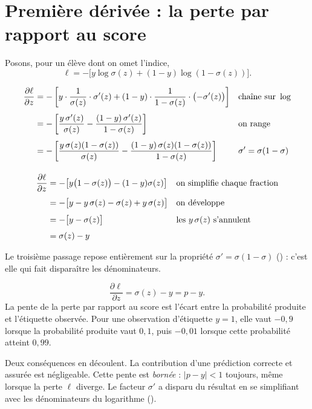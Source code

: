 \section{Première dérivée : la perte par rapport au score}

Posons, pour un élève dont on omet l'indice,
\[
  \ell=-\bigl[y\log\sigma(z)+(1-y)\log(1-\sigma(z))\bigr].
\]

\begin{align}
  \frac{\partial \ell}{\partial z}
  &= -\left[y\cdot\frac{1}{\sigma(z)}\cdot\sigma'(z)
     +(1-y)\cdot\frac{1}{1-\sigma(z)}\cdot\bigl(-\sigma'(z)\bigr)\right]
    &&\text{chaîne sur } \log \notag\\[4pt]
  &= -\left[\frac{y\,\sigma'(z)}{\sigma(z)}
     -\frac{(1-y)\,\sigma'(z)}{1-\sigma(z)}\right]
    &&\text{on range} \notag\\[4pt]
  &= -\left[\frac{y\,\sigma(z)(1-\sigma(z))}{\sigma(z)}
     -\frac{(1-y)\,\sigma(z)(1-\sigma(z))}{1-\sigma(z)}\right]
    &&\sigma'=\sigma(1-\sigma) \notag\\[4pt]
\end{align}

\slidebreak

\begin{align}
  \frac{\partial \ell}{\partial z}
  &= -\bigl[y\bigl(1-\sigma(z)\bigr)-(1-y)\sigma(z)\bigr]
    &&\text{on simplifie chaque fraction} \notag\\[4pt]
  &= -\bigl[y-y\,\sigma(z)-\sigma(z)+y\,\sigma(z)\bigr]
    &&\text{on développe} \notag\\[4pt]
  &= -\bigl[y-\sigma(z)\bigr]
    &&\text{les } y\,\sigma(z) \text{ s'annulent} \notag\\[4pt]
  &= \sigma(z)-y \label{eq:dl-dz}
\end{align}

Le troisième passage repose entièrement sur la propriété
$\sigma'=\sigma(1-\sigma)$ () : c'est elle qui fait
disparaître les dénominateurs.

\begin{resultat}[Résidu]
\[
  \frac{\partial \ell}{\partial z}=\sigma(z)-y=p-y .
\]
La pente de la perte par rapport au score est l'écart entre la probabilité
produite et l'étiquette observée. Pour une observation d'étiquette $y=1$, elle
vaut $-0{,}9$ lorsque la probabilité produite vaut $0{,}1$, puis $-0{,}01$
lorsque cette probabilité atteint $0{,}99$.

Deux conséquences en découlent. La contribution d'une prédiction correcte
et assurée est négligeable. Cette pente est \emph{bornée} : $|p-y|<1$ toujours,
même lorsque la perte $\ell$ diverge. Le facteur $\sigma'$ a disparu du résultat
en se simplifiant avec les dénominateurs du logarithme
().
\end{resultat}

